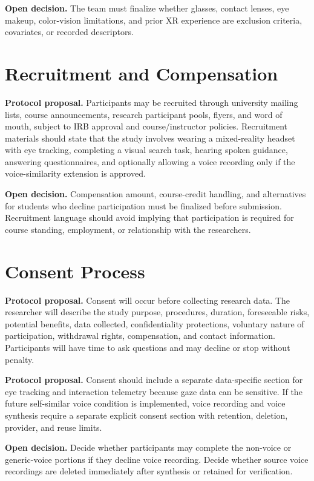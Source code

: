 \documentclass[11pt,letterpaper]{article}
\newcommand{\status}[1]{\textbf{#1.}}
\begin{document}
\status{Open decision} The team must finalize whether glasses, contact lenses, eye makeup, color-vision limitations, and prior XR experience are exclusion criteria, covariates, or recorded descriptors.

\section{Recruitment and Compensation}

\status{Protocol proposal} Participants may be recruited through university mailing lists, course announcements, research participant pools, flyers, and word of mouth, subject to IRB approval and course/instructor policies. Recruitment materials should state that the study involves wearing a mixed-reality headset with eye tracking, completing a visual search task, hearing spoken guidance, answering questionnaires, and optionally allowing a voice recording only if the voice-similarity extension is approved.

\status{Open decision} Compensation amount, course-credit handling, and alternatives for students who decline participation must be finalized before submission. Recruitment language should avoid implying that participation is required for course standing, employment, or relationship with the researchers.

\section{Consent Process}

\status{Protocol proposal} Consent will occur before collecting research data. The researcher will describe the study purpose, procedures, duration, foreseeable risks, potential benefits, data collected, confidentiality protections, voluntary nature of participation, withdrawal rights, compensation, and contact information. Participants will have time to ask questions and may decline or stop without penalty.

\status{Protocol proposal} Consent should include a separate data-specific section for eye tracking and interaction telemetry because gaze data can be sensitive. If the future self-similar voice condition is implemented, voice recording and voice synthesis require a separate explicit consent section with retention, deletion, provider, and reuse limits.

\status{Open decision} Decide whether participants may complete the non-voice or generic-voice portions if they decline voice recording. Decide whether source voice recordings are deleted immediately after synthesis or retained for verification.
\end{document}
